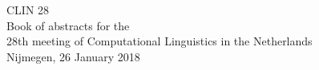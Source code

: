 \hspace{0pt}
\vspace{\fill}
\begin{center}
  {\Huge CLIN 28}\\[2em]

  Book of abstracts for the \\ 28th meeting of Computational Linguistics in the Netherlands \\[5cm]

  Nijmegen, 26 January 2018
\end{center}
\vspace{\fill}
\hspace{0pt}
